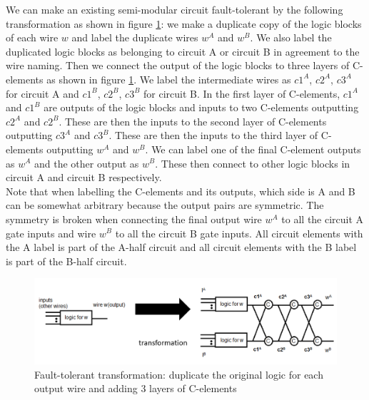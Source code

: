 \documentclass[12pt]{report}
\begin{document}
We can make an existing semi-modular circuit fault-tolerant by the following transformation as shown in figure \ref{fig:dupscheme}: we make a duplicate copy of the logic blocks of each wire $w$ and label the duplicate wires $w^A$ and $w^B$.  We also label the duplicated logic blocks as belonging to circuit A or circuit B in agreement to the wire naming.  Then we connect the output of the logic blocks to three layers of C-elements as shown in figure \ref{fig:dupscheme}.  We label the intermediate wires as $c1^A$, $c2^A$, $c3^A$ for circuit A and $c1^B$, $c2^B$, $c3^B$ for circuit B.  In the first layer of C-elements, $c1^A$ and $c1^B$ are outputs of the logic blocks and inputs to two C-elements outputting $c2^A$ and $c2^B$.  These are then the inputs to the second layer of C-elements outputting $c3^A$ and $c3^B$.  These are then the inputs to the third layer of C-elements outputting $w^A$ and $w^B$.  We can label one of the final C-element outputs as $w^A$ and the other output as $w^B$.  These then connect to other logic blocks in circuit A and circuit B respectively.  \\
Note that when labelling the C-elements and its outputs, which side is A and B can be somewhat arbitrary because the output pairs are symmetric.  The symmetry is broken when connecting the final output wire $w^A$ to all the circuit A gate inputs and wire $w^B$ to all the circuit B gate inputs.  All circuit elements with the A label is part of the A-half circuit and all circuit elements with the B label is part of the B-half circuit.\\%
\begin{figure}
  \centering
    \includegraphics[width=\textwidth]{circuitforproof3}
  \caption{Fault-tolerant transformation: duplicate the original logic for each output wire and adding 3 layers of C-elements}
  \label{fig:dupscheme}
\end{figure}
\end{document}
